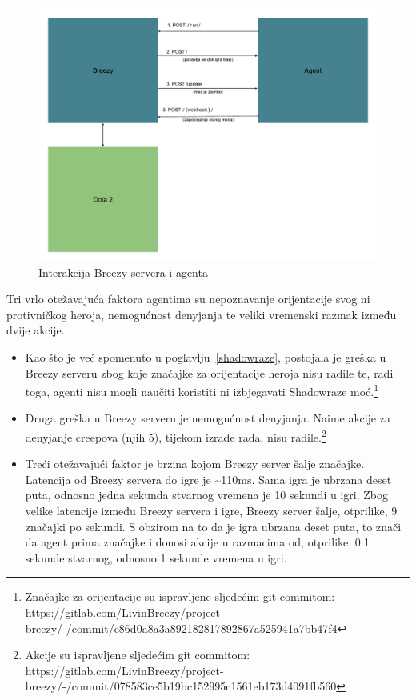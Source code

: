 \documentclass[times, utf8, zavrsni, numeric]{fer}
\begin{document}
\begin{figure}[h] 
    \centering
    \includegraphics[width=15cm]{img/breezy}
    \caption{Interakcija Breezy servera i agenta}\label{fig:breezy}
\end{figure}

Tri vrlo otežavajuća faktora agentima su nepoznavanje orijentacije svog ni
protivničkog heroja, nemogućnost denyjanja te veliki vremenski razmak između
dvije akcije.
\begin{itemize}
    \item Kao što je već spomenuto u poglavlju~\ref{shadowraze}, postojala je
        greška u Breezy serveru zbog koje značajke za orijentacije heroja nisu
        radile te, radi toga, agenti nisu mogli naučiti koristiti ni izbjegavati
        Shadowraze moć.\footnote{Značajke za orijentacije su ispravljene
        sljedećim git commitom:
        https://gitlab.com/LivinBreezy/project-breezy/-/commit/e86d0a8a3a892182817892867a525941a7bb47f4}
    \item Druga greška u Breezy serveru je nemogućnost denyjanja. Naime akcije
        za denyjanje creepova (njih 5), tijekom izrade rada, nisu
        radile.\footnote{Akcije su ispravljene sljedećim git commitom:
        https://gitlab.com/LivinBreezy/project-breezy/-/commit/078583ce5b19bc152995c1561eb173d4091fb560}
    \item Treći otežavajući faktor je brzina kojom Breezy server šalje značajke.
        Latencija od Breezy servera do igre je \textasciitilde110ms. Sama igra
        je ubrzana deset puta, odnosno jedna sekunda stvarnog vremena je 10
        sekundi u igri. Zbog velike latencije između Breezy servera i igre,
        Breezy server šalje, otprilike, 9 značajki po sekundi. S obzirom na to
        da je igra ubrzana deset puta, to znači da agent prima značajke i donosi
        akcije u razmacima od, otprilike, 0.1 sekunde stvarnog, odnosno 1
        sekunde vremena u igri.
\end{itemize}
\end{document}

